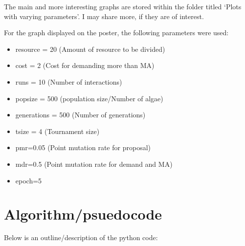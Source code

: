 \documentclass[]{article}
\begin{document}
The main and more interesting graphs are stored within the folder titled
`Plots with varying parameters'. I may share more, if they are of
interest.

For the graph displayed on the poster, the following parameters were
used:

\begin{itemize}
  \item resource = 20           (Amount of resource to be divided)
  \item cost = 2              (Cost for demanding more than MA)
  \item runs = 10                (Number of interactions)
  \item popsize = 500          (population size/Number of algae)
  \item generations = 500       (Number of generations)
  \item tsize = 4              (Tournament size)
  \item pmr=0.05            (Point mutation rate for proposal)
  \item mdr=0.5             (Point mutation rate for demand and MA)
  \item epoch=5
\end{itemize}

\section{Algorithm/psuedocode}\label{algorithmpsuedocode}

Below is an outline/description of the python code:
\end{document}
